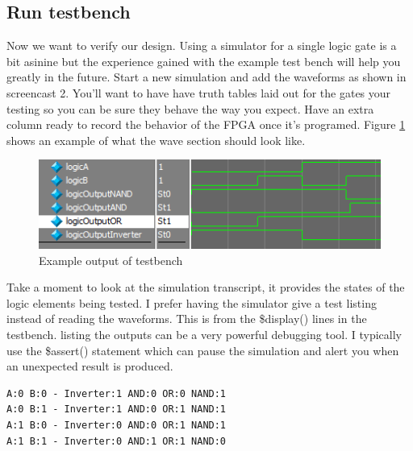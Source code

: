 \documentclass[12pt,journal]{IEEEtran}
\begin{document}
    \subsection{\bfseries Run testbench}
    Now we want to verify our design. Using a simulator for a single logic gate is a bit asinine but
    the experience gained with the example test bench will help you greatly in the future. Start a new simulation 
    and add the waveforms as shown in screencast 2. You'll want to have have truth tables laid out for the
    gates your testing so you can be sure they behave the way you expect. Have an extra column ready to record
    the behavior of the FPGA once it's programed. Figure \ref{LogicOut} shows an example of what the wave section
    should look like.
    \begin{figure}[H]
      \label{LogicOut}
      \includegraphics[width=.48\textwidth]{Images/LogicOutput.png}
      \caption{Example output of testbench}
    \end{figure}
    Take a moment to look at the simulation transcript, it provides the states of the logic elements being tested.
    I prefer having the simulator give a test listing instead of reading the waveforms. This is from the \$display()
    lines in the testbench. listing the outputs can be a very powerful debugging tool. I typically use the \$assert()
    statement which can pause the simulation and alert you when an unexpected result is produced.
    \begin{lstlisting}
A:0 B:0 - Inverter:1 AND:0 OR:0 NAND:1
A:0 B:1 - Inverter:1 AND:0 OR:1 NAND:1
A:1 B:0 - Inverter:0 AND:0 OR:1 NAND:1
A:1 B:1 - Inverter:0 AND:1 OR:1 NAND:0
    \end{lstlisting}

    
\end{document}
